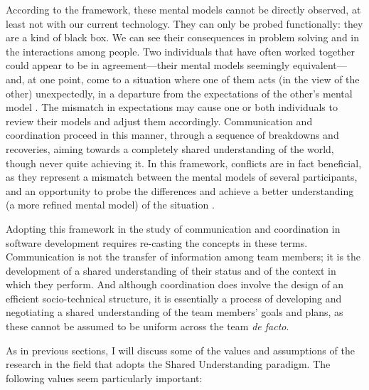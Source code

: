 According to the framework, these mental models cannot be directly observed, at least not with our current technology. They can only be probed functionally: they are a kind of black box. We can see their consequences in problem solving and in the interactions among people. Two individuals that have often worked together could appear to be in agreement---their mental models seemingly equivalent---and, at one point, come to a situation where one of them acts (in the view of the other) unexpectedly, in a departure from the expectations of the other's mental model \cite{Mathieu2000}. The mismatch in expectations may cause one or both individuals to review their models and adjust them accordingly. Communication and coordination proceed in this manner, through a sequence of breakdowns and recoveries, aiming towards a completely shared understanding of the world, though never quite achieving it. In this framework, conflicts are in fact beneficial, as they represent a mismatch between the mental models of several participants, and an opportunity to probe the differences and achieve a better understanding (a more refined mental model) of the situation \cite{Easterbrook1994}.

Adopting this framework in the study of communication and coordination in software development requires re-casting the concepts in these terms. Communication is not the transfer of information among team members; it is the development of a shared understanding of their status and of the context in which they perform. And although coordination does involve the design of an efficient socio-technical structure, it is essentially a process of developing and negotiating a shared understanding of the team members' goals and plans, as these cannot be assumed to be uniform across the team \emph{de facto}.

As in previous sections, I will discuss some of the values and assumptions of the research in the field that adopts the Shared Understanding paradigm. The following values seem particularly important:

